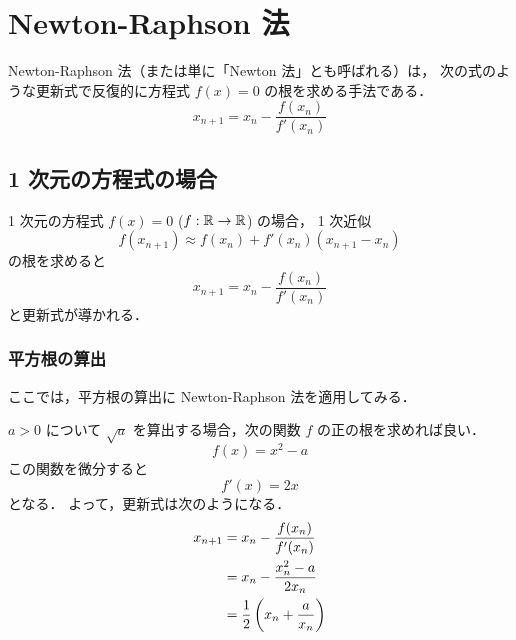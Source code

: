%

\chapter{Newton-Raphson 法}\label{chap:root-finding_newton-raphson}

Newton-Raphson 法（または単に「Newton 法」とも呼ばれる）は，
次の式のような更新式で反復的に方程式 $f(x) = 0$ の根を求める手法である．
\begin{equation}
    x_{n+1} = x_n - \frac{f(x_n)}{f'(x_n)}
\end{equation}

\section{1 次元の方程式の場合}

1 次元の方程式 $f(x) = 0$ ($f: \mathbb{R} \to \mathbb{R}$) の場合，
1 次近似
\begin{equation}
    f(x_{n+1}) \approx f(x_n) + f'(x_n) (x_{n+1} - x_n)
\end{equation}
の根を求めると
\begin{equation}
    x_{n+1} = x_n - \frac{f(x_n)}{f'(x_n)}
    \label{eq:root-finding_newton-raphson_one-dim-update-law}
\end{equation}
と更新式が導かれる．

\subsection{平方根の算出}

ここでは，平方根の算出に Newton-Raphson 法を適用してみる．

$a>0$ について $\sqrt{a}$ を算出する場合，次の関数 $f$ の正の根を求めれば良い．
\begin{equation}
    f(x) = x^2 - a
\end{equation}
この関数を微分すると
\begin{equation}
    f'(x) = 2x
\end{equation}
となる．
よって，更新式は次のようになる．
\begin{align}
    x_{n+1} & = x_n - \frac{f(x_n)}{f'(x_n)}          \notag \\
            & = x_n - \frac{x_n^2 - a}{2x_n}          \notag \\
            & = \frac{1}{2}\left(x_n + \frac{a}{x_n}\right)
    \label{eq:root-finding_newton-raphson_sqrt-update-law}
\end{align}

